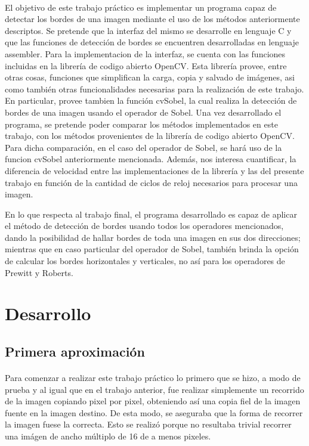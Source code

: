 \documentclass[11pt, a4paper]{article}
\begin{document}
\paragraph{}
El objetivo de este trabajo pr\'actico es implementar un programa capaz de detectar los bordes de una imagen mediante el uso de los m\'etodos anteriormente descriptos. Se pretende que la interfaz del mismo se desarrolle en lenguaje C y que las funciones de detecci\'on de bordes se encuentren desarrolladas en lenguaje assembler.
Para la implementacion de la interfaz, se cuenta con las funciones incluidas en la librer\'ia de codigo abierto OpenCV. Esta librer\'ia provee, entre otras cosas, funciones que simplifican la carga, copia y salvado de im\'agenes, asi como tambi\'en otras funcionalidades necesarias para la realizaci\'on de este trabajo. En particular, provee tambien la funci\'on cvSobel, la cual realiza la detecci\'on de bordes de una imagen usando el operador de Sobel.
Una vez desarrollado el programa, se pretende poder comparar los m\'etodos implementados en este trabajo, con los m\'etodos provenientes de la librer\'ia de codigo abierto OpenCV. Para dicha comparaci\'on, en el caso del operador de Sobel, se har\'a uso de la funcion cvSobel anteriormente mencionada. Adem\'as, nos interesa cuantificar, la diferencia de velocidad entre las implementaciones de la librer\'ia y las del presente trabajo en funci\'on de la cantidad de ciclos de reloj necesarios para procesar una imagen.

En lo que respecta al trabajo final, el programa desarrollado es capaz de aplicar el m\'etodo de detecci\'on de bordes usando todos los operadores mencionados, dando la posibilidad de hallar bordes de toda una imagen en sus dos direcciones; mientras que en caso particular del operador de Sobel, tambi\'en brinda la opci\'on de calcular los bordes horizontales y verticales, no as\'i para los operadores de Prewitt y Roberts.

\newpage

\section{Desarrollo}

\subsection{Primera aproximaci\'on}
\paragraph{}
Para comenzar a realizar este trabajo pr\'actico lo primero que se hizo, a modo de prueba y al igual que en el trabajo anterior, fue realizar simplemente un recorrido de la imagen copiando pixel por pixel, obteniendo as\'i una copia fiel de la imagen fuente en la imagen destino. De esta modo, se aseguraba que la forma de recorrer la imagen fuese la correcta. Esto se realiz\'o porque no resultaba trivial recorrer una im\'agen de ancho m\'ultiplo de 16 de a menos pixeles.
\end{document}
